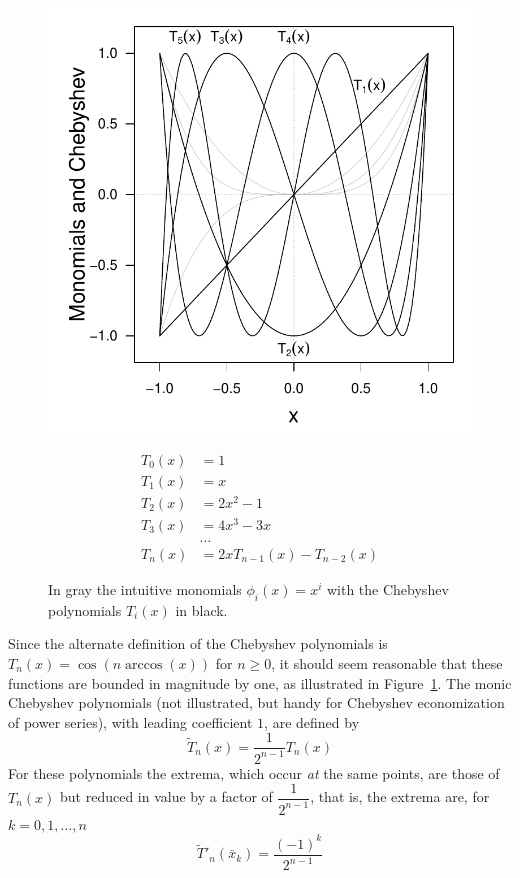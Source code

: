 \documentclass[11pt]{article}
\begin{document}
\begin{figure}[h!]\centering

\begin{minipage}[c]{0.48\textwidth}
\includegraphics[width=\textwidth]{cheb_funs.pdf}

\end{minipage}
\begin{minipage}[c]{0.48\textwidth}
\begin{align*}
T_0(x) & = 1\\
T_1(x) & = x\\
T_2(x) & = 2x^2-1\\
T_3(x) & = 4x^3-3x\\
 & \dots\\
T_n(x) & = 2xT_{n-1}(x) - T_{n-2}(x)
\end{align*}

\caption{In gray the intuitive monomials \(\phi_i(x) = x^i\) with the Chebyshev polynomials \(T_i(x)\) in black.}\label{fig::cheb}

\end{minipage}
\end{figure}

Since the alternate definition of the Chebyshev polynomials is \(T_n(x) = \cos(n\arccos(x))\) for \(n\geq0\), it should seem reasonable that these functions are bounded in magnitude by one, as illustrated in Figure~\ref{fig::cheb}.  The monic Chebyshev polynomials (not illustrated, but handy for Chebyshev economization of power series), with leading coefficient \(1\), are defined by \[\tilde T_n(x) = \dfrac{1}{2^{n-1}}T_n(x)\] For these polynomials the extrema, which occur \textit{at} the same points, are those of \(T_n(x)\) but reduced in value by a factor of \(\dfrac{1}{2^{n-1}}\), that is, the extrema are, for \(k=0, 1, \dots, n\) \[\tilde T'_n(\bar x_k) = \dfrac{(-1)^k}{2^{n-1}}\]
\end{document}
